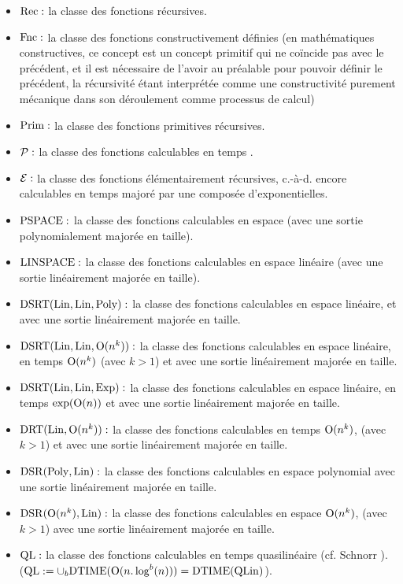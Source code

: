 \begin{itemize}
\item ${\rm Rec} :$ la classe des fonctions récursives.
\item ${\rm Fnc} :$ la classe des fonctions constructivement définies  (en 
mathématiques constructives, ce concept est un concept primitif qui ne 
coïncide pas avec le précédent, et il est nécessaire de l'avoir au 
préalable pour pouvoir définir le précédent, la récursivité étant 
interprétée comme une constructivité purement mécanique dans son 
déroulement comme processus de calcul)
\item ${\rm Prim} :$ la classe des fonctions primitives récursives.
\item ${\cal P} :$ la classe des fonctions calculables en temps \poll.
\item ${\cal E}:$ la classe des fonctions élémentairement récursives, c.-à-d. 
encore calculables en temps majoré par une composée d'exponentielles.
\item ${\rm PSPACE} :$ la classe des fonctions calculables en espace \poll (avec 
une sortie 
polynomialement majorée en taille).
\item ${\rm LINSPACE} :$ la classe des fonctions calculables en espace linéaire (avec une sortie linéairement majorée en taille).
\item ${\rm DSRT}({\rm Lin}, {\rm Lin}, {\rm Poly}):$ la classe des fonctions calculables en espace 
linéaire, \etpo  et avec une sortie linéairement majorée en taille.
\item ${\rm DSRT}({\rm Lin}, {\rm Lin}, {\rm O}(n^k)):$ la classe des fonctions calculables en espace 
linéaire, en temps ${\rm O}(n^k)$ (avec  $k > 1$)  et avec une sortie 
linéairement majorée en taille.
\item ${\rm DSRT}({\rm Lin}, {\rm Lin}, {\rm Exp}):$ la classe des fonctions calculables en espace linéaire, en temps $\exp({\rm O}(n))$  et avec une sortie linéairement majorée en taille.
\item ${\rm DRT}({\rm Lin},{\rm O}(n^k)):$ la classe des fonctions calculables en temps 
${\rm O}(n^k)$, (avec  $k > 1$)  et avec une sortie linéairement majorée en 
taille.
\item ${\rm DSR}({\rm Poly}, {\rm Lin}):$ la classe des fonctions calculables en espace 
polynomial  avec une sortie linéairement majorée en taille.
\item ${\rm DSR}({\rm O}(n^k), {\rm Lin}):$ la classe des fonctions calculables en espace 
${\rm O}(n^k)$, (avec  $k > 1$)   avec une sortie linéairement majorée en taille.
\item ${\rm QL}:$ la classe des fonctions calculables en temps 
quasilinéaire (cf. Schnorr \cite{fSc}). \\ (${\rm QL}: = \cup_b {\rm DTIME} 
({\rm O}(n.\log^b(n))) = {\rm DTIME} ({\rm QLin})$).
\end{itemize}

